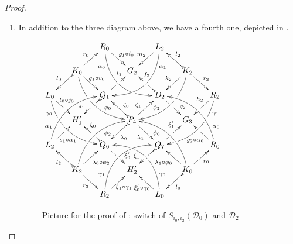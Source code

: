 \documentclass[a4paper,UKenglish,cleveref,pdftex,thm-restate,numberwithinsect,anonymous]{lipics}
\newcommand{\dder}[1]{\mathscr{#1}}
\begin{document}
\begin{proof}
\begin{enumerate}
		\item In addition to the three diagram above, we have a fourth one, depicted in .
		\begin{figure}[h]
			\centering
			$\xymatrix@C=15pt@R=15pt{&&R_0 \ar@/_.8cm/[ddrr]_(.2){\alpha_0}|(.7)\hole \ar[dr]^{\hspace{-1pt}g_1\circ i_0}&& L_2\ar@/^.8cm/[ddll]^(.2){\alpha_1}  \ar[dl]_{m_2\hspace{-2pt}}\\
				&K_0\ar[dr]^{\hspace{-4pt}q_1\circ v_0}\ar@{>->}[dl]_{l_0} \ar@/_.6cm/[ddrr]|(.36)\hole^(.65){\phi_0}\ar[ur]^{r_0}&& G_2 && K_2 \ar@/^.6cm/[ddll]|(.36)\hole_(.65){\phi_2}\ar[dl]_{k_2}\ar@{>->}[lu]_{l_2} \ar[dr]^{r_2}\\
				L_0 \ar@/_.6cm/[ddrr]_(.2){\gamma_0}|(.31)\hole|(.81)\hole \ar[dr]^(.4){\hspace{-4pt}t_0\circ j_0}|(.6)\hole && Q_1 \ar@{>->}[dl]|(.4)\hole_(.65){s_1}\ar[ur]|(.5)\hole^(.7){t_1}&&D_2 \ar[dr]|(.4)\hole^(.65){g_2} \ar@{>->}[ul]|(.5)\hole_(.65){f_2}&&R_2\ar@/^.6cm/[ddll]^(.2){\gamma_1}|(.31)\hole|(.81)\hole\ar[dl]_(.35){h_2}|(.6)\hole\\&H'_1 &&P_4\ar[dr]_{\lambda_1} \ar@{>->}[dl]^{\lambda_0}\ar[ur]^(.4){\zeta_1}\ar@{>->}[ul]_(.4){\zeta_0}&&G_3\\
				L_2 \ar@/^.6cm/[uurr]^(.2){\alpha_1} \ar[ur]_(.35){\hspace{-2pt}s_1\circ
					\alpha_1}|(.61)\hole&&Q_6
				\ar@{>->}[ul]|(.4)\hole_(.6){\xi_0}\ar[dr]|(.5)\hole^(.65){\xi'_0}
				&&Q_7\ar[ur]|(.4)\hole^(.6){\xi'_1}
				\ar@{>->}[dl]|(.5)\hole_(.65){\xi_1} && R_0 \ar[ul]^(.35){g_2\circ
					\alpha_0}|(.61)\hole\ar@/_.6cm/[uull]_(.2){\alpha_0}\\&K_2
				\ar[ur]_{\lambda_0\circ \phi_2} \ar[dr]_{r_2}
				\ar@{>->}[ul]^{l_2}\ar@/^.6cm/[uurr]_(.65){\phi_2}&&H'_2&& K_0
				\ar[ur]_{r_0} \ar[ul]^{\lambda_1\circ \phi_0} \ar@{>->}[dl]^{l_0}
				\ar@/_.6cm/[uull]^(.65){\phi_0}\\&& R_2
				\ar[ur]_{\hspace{-5pt}\xi_1\circ
					\gamma_1}\ar@/^.8cm/[uurr]^(.2){\gamma_1}&& L_0
				\ar[ul]^{\xi'_0\circ \gamma_0\hspace{-7pt}}
				\ar@/_.8cm/[uull]_(.2){\gamma_0} |(.69)\hole 
			}	$
			\caption{Picture for the proof of : switch of $S_{i_0, i_2}(\dder{D}_0)$ and $\dder{D}_2$}
			\label{fi:fourth}
		\end{figure}
		

\end{enumerate}
\end{proof}
\end{document}
